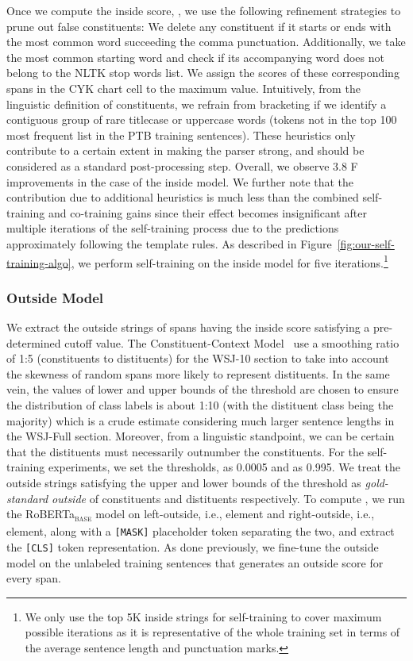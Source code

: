 \documentclass[11pt]{article}
\newcommand{\ptb}{\textsc{PTB}}
\newcommand{\roberta}{RoBERTa}
\begin{document}
Once we compute the inside score, , we use the following refinement strategies to prune out false constituents:
We delete any constituent if it starts or ends with the most common word succeeding the comma punctuation.
Additionally, we take the most common starting word and check if its accompanying word does not belong to the NLTK stop words list. We assign the scores of these corresponding spans in the CYK chart cell to the maximum value. Intuitively, from the linguistic definition of constituents, we refrain from bracketing if we identify a contiguous group of rare titlecase or uppercase words (tokens not in the top 100 most frequent list in the \ptb{} training sentences).
These heuristics only contribute to a certain extent in making the parser strong, and should be considered as a standard post-processing step. Overall, we observe 3.8 F improvements in the case of the inside model. We further note that the contribution due to additional heuristics is much less than the combined self-training and co-training gains since their effect becomes insignificant after multiple iterations of the self-training process due to the predictions approximately following the template rules.
As described in Figure~\ref{fig:our-self-training-algo}, we perform self-training on the inside model for five iterations.\footnote{We only use the top 5K inside strings for self-training to cover maximum possible iterations as it is representative of the whole training set in terms of the average sentence length and punctuation marks.}

\subsubsection{Outside Model}
\label{ssec:outside-model-prepare}
We extract the outside strings of spans having the inside score satisfying a pre-determined cutoff value.  The Constituent-Context Model~\citep{klein-manning-2002-generative} use a smoothing ratio of 1:5 (constituents to distituents) for the WSJ-10 section to take into account the skewness of random spans more likely to represent distituents. In the same vein, the values of lower and upper bounds of the threshold are chosen to ensure the distribution of class labels is about 1:10 (with the distituent class being the majority) which is a crude estimate considering much larger sentence lengths in the WSJ-Full section.
Moreover, from a linguistic standpoint, we can be certain that the distituents must necessarily outnumber the constituents. For the self-training experiments, we set the thresholds,  as 0.0005 and  as 0.995. We treat the outside strings satisfying the upper and lower bounds of the threshold as \emph{gold-standard outside} of constituents and distituents respectively. To compute , we run the \roberta{}\textsubscript{\textsc{base}} model on left-outside, i.e.,  element and right-outside, i.e.,  element, along with a \texttt{[MASK]} placeholder token separating the two, and extract the \texttt{[CLS]} token representation. As done previously, we fine-tune the outside model on the unlabeled training sentences that generates an outside score  for every span.
\end{document}
